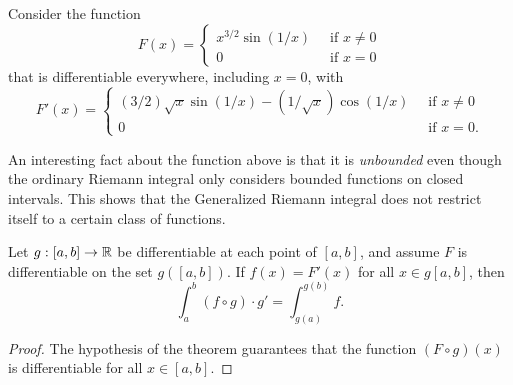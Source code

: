 Consider the function 
\[  F(x) = 
\begin{cases}
    x^{3/2} \sin(1/x) \ &\text{ if } x \neq 0 \\
    0 \ &\text{ if } x = 0
\end{cases} \]
that is differentiable everywhere, including \( x = 0  \), with 
\[  F'(x) = 
\begin{cases}
    (3/2)\sqrt{ x }  \sin (1/x) - (1 / \sqrt{ x } ) \cos(1/x) \ &\text{ if } x \neq 0 \\
    0 \ &\text { if } x = 0.
\end{cases} \]

An interesting fact about the function above is that it is \textit{unbounded} even though the ordinary Riemann integral only considers bounded functions on closed intervals. This shows that the Generalized Riemann integral does not restrict itself to a certain class of functions. 
\begin{theorem} Let \(g: [a,b] \to \mathbb{R}  \) be differentiable at each point of \( [a,b]  \), and assume \( F  \) is differentiable on the set \( g([a,b] ) \). If \( f(x) = F'(x)  \) for all \( x \in g[a,b]  \), then 
        \[  \int_{ a }^{ b } (f \circ g) \cdot g' = \int_{ g(a) }^{ g(b)  } f. \]
\end{theorem}

\begin{proof}
    The hypothesis of the theorem guarantees that the function \( (F \circ g )(x)  \) is differentiable for all \( x \in [a,b] \).
\end{proof}

